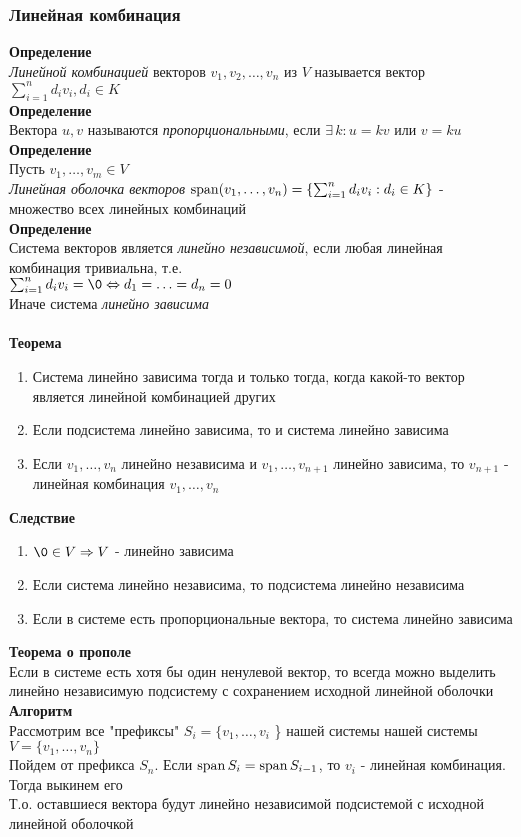 \documentclass[12pt]{article}
\begin{document}
\subsubsection{Линейная комбинация}
\textbf{Определение}\\
\textit{Линейной комбинацией} векторов $v_1, v_2, \ldots, v_n$ из $V$ называется вектор $\sum_{i=1}^n d_iv_i, d_i \in K$\\
\textbf{Определение}\\
Вектора $u,v$ называются \textit{пропорциональными}, если $\exists\,k: u = kv$ или $v = ku$\\
\textbf{Определение}\\
Пусть $v_1, \ldots, v_m \in V$\\
\textit{Линейная оболочка векторов} $\operatorname{span}(v_1,\ldots,v_n) = \left\{ \sum_{i=1}^n d_iv_i: d_i \in K\right\}$ - множество всех линейных комбинаций\\
\textbf{Определение}\\
Система векторов является \textit{линейно независимой}, если любая линейная комбинация тривиальна, т.е.\\
$\sum_{i=1}^n d_iv_i = \0 \Leftrightarrow d_1 = \ldots = d_n = 0$\\
Иначе система \textit{линейно зависима}\\\\
\textbf{Теорема}
\begin{enumerate}
    \item Система линейно зависима тогда и только тогда, когда какой-то вектор является линейной комбинацией других
    \item Если подсистема линейно зависима, то и система линейно зависима
    \item Если $v_1,\ldots,v_n$ линейно независима и $v_1, \ldots, v_{n+1}$ линейно зависима, то $v_{n+1}$ - линейная комбинация $v_1,\ldots,v_n$
\end{enumerate}
\textbf{Следствие}
\begin{enumerate}
    \item $\0 \in V \Rightarrow V$ - линейно зависима
    \item Если система линейно независима, то подсистема линейно независима
    \item Если в системе есть пропорциональные вектора, то система линейно зависима
\end{enumerate}
\textbf{Теорема о прополе}\\
Если в системе есть хотя бы один ненулевой вектор, то всегда можно выделить линейно независимую подсистему с сохранением исходной линейной оболочки\\
\textbf{Алгоритм}\\
Рассмотрим все "префиксы" $S_i = \{ v_1, \ldots, v_i$ \} нашей системы нашей системы $V = \{ v_1, \ldots, v_n \}$\\
Пойдем от префикса $S_n$. Если $\operatorname{span} S_i = \operatorname{span} S_{i-1}$, то $v_i$ - линейная комбинация. Тогда выкинем его\\
Т.о. оставшиеся вектора будут линейно независимой подсистемой с исходной линейной оболочкой\\
\end{document}
